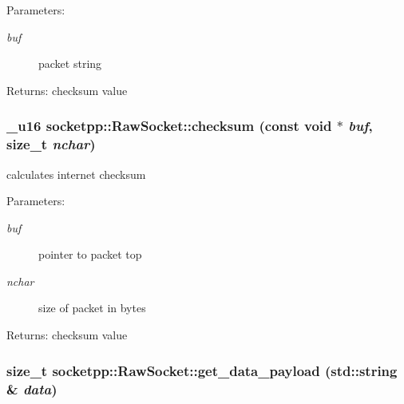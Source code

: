 \begin{Desc}
\item[Parameters:]
\begin{description}
\item[{\em buf}]packet string \end{description}
\end{Desc}
\begin{Desc}
\item[Returns:]checksum value \end{Desc}
\hypertarget{classsocketpp_1_1RawSocket_bb78ecebb5bd5ab5be4ee46d786fe5cd}{
\subsubsection[{checksum}]{\setlength{\rightskip}{0pt plus 5cm}\_\-u16 socketpp::RawSocket::checksum (const void $\ast$ {\em buf}, \/  size\_\-t {\em nchar})}}
\label{classsocketpp_1_1RawSocket_bb78ecebb5bd5ab5be4ee46d786fe5cd}


calculates internet checksum 

\begin{Desc}
\item[Parameters:]
\begin{description}
\item[{\em buf}]pointer to packet top \item[{\em nchar}]size of packet in bytes \end{description}
\end{Desc}
\begin{Desc}
\item[Returns:]checksum value \end{Desc}
\hypertarget{classsocketpp_1_1RawSocket_de47c63d60cba25d1ae82f242851610d}{
\subsubsection[{get\_\-data\_\-payload}]{\setlength{\rightskip}{0pt plus 5cm}size\_\-t socketpp::RawSocket::get\_\-data\_\-payload (std::string \& {\em data})}}
\label{classsocketpp_1_1RawSocket_de47c63d60cba25d1ae82f242851610d}



